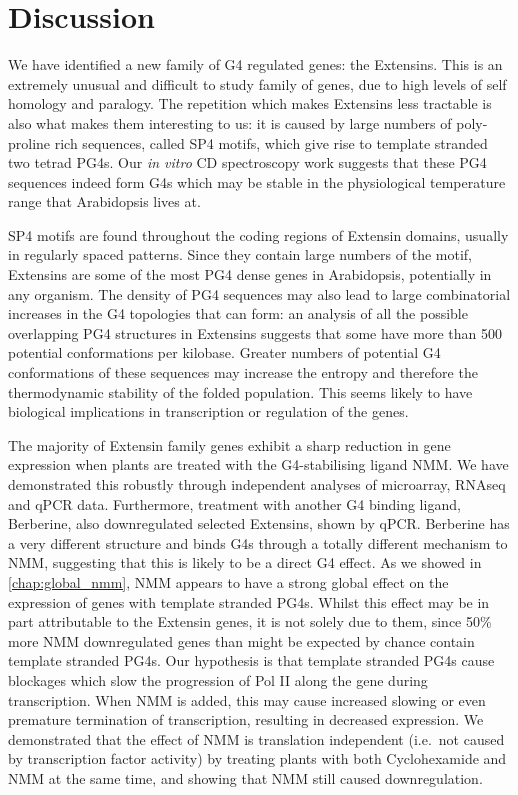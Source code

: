 \documentclass[12pt,a4paper,]{report}
\begin{document}
\newpage

\hypertarget{discussion-2}{%
\section{Discussion}\label{discussion-2}}

\label{sec:extensin_discuss}

We have identified a new family of G4 regulated genes: the Extensins.
This is an extremely unusual and difficult to study family of genes, due
to high levels of self homology and paralogy. The repetition which makes
Extensins less tractable is also what makes them interesting to us: it
is caused by large numbers of poly-proline rich sequences, called SP4
motifs, which give rise to template stranded two tetrad PG4s. Our
\emph{in vitro} CD spectroscopy work suggests that these PG4 sequences
indeed form G4s which may be stable in the physiological temperature
range that Arabidopsis lives at.

SP4 motifs are found throughout the coding regions of Extensin domains,
usually in regularly spaced patterns. Since they contain large numbers
of the motif, Extensins are some of the most PG4 dense genes in
Arabidopsis, potentially in any organism. The density of PG4 sequences
may also lead to large combinatorial increases in the G4 topologies that
can form: an analysis of all the possible overlapping PG4 structures in
Extensins suggests that some have more than 500 potential conformations
per kilobase. Greater numbers of potential G4 conformations of these
sequences may increase the entropy and therefore the thermodynamic
stability of the folded population. This seems likely to have biological
implications in transcription or regulation of the genes.

The majority of Extensin family genes exhibit a sharp reduction in gene
expression when plants are treated with the G4-stabilising ligand NMM.
We have demonstrated this robustly through independent analyses of
microarray, RNAseq and qPCR data. Furthermore, treatment with another G4
binding ligand, Berberine, also downregulated selected Extensins, shown
by qPCR. Berberine has a very different structure and binds G4s through
a totally different mechanism to NMM, suggesting that this is likely to
be a direct G4 effect. As we showed in \autoref{chap:global_nmm}, NMM
appears to have a strong global effect on the expression of genes with
template stranded PG4s. Whilst this effect may be in part attributable
to the Extensin genes, it is not solely due to them, since 50\% more NMM
downregulated genes than might be expected by chance contain template
stranded PG4s. Our hypothesis is that template stranded PG4s cause
blockages which slow the progression of Pol II along the gene during
transcription. When NMM is added, this may cause increased slowing or
even premature termination of transcription, resulting in decreased
expression. We demonstrated that the effect of NMM is translation
independent (i.e.~not caused by transcription factor activity) by
treating plants with both Cyclohexamide and NMM at the same time, and
showing that NMM still caused downregulation.
\end{document}
